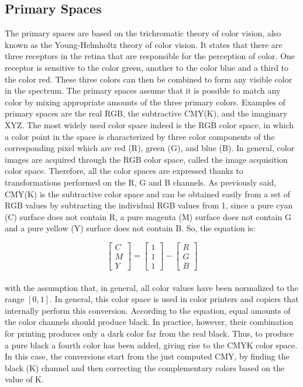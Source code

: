 \subsection{Primary Spaces}  
The primary spaces are based on the trichromatic theory of color vision, also known as the Young-Helmholtz theory of color vision. It states that there are three receptors in the retina that are responsible for the perception of color. One receptor is sensitive to the color green, another to the color blue and a third to the color red. These three colors can then be combined to form any visible color in the spectrum.
The primary spaces assume that it is possible to match any color by mixing appropriate amounts of the three primary colors. Examples of primary spaces are the real RGB, the subtractive CMY(K), and the imaginary XYZ. The most widely used color space indeed is the RGB color space, in which a color point in the space is characterized by three color components of the corresponding pixel which are red (R), green (G), and blue (B). In general, color images are acquired through the RGB color space, called the image acquisition color space. Therefore, all the color spaces are expressed thanks to transformations performed on the R, G and B channels.
As previously said, CMY(K) is the subtractive color space and can be obtained easily from a set of RGB values by subtracting the individual RGB values from 1, since a pure cyan (C) surface does not contain R, a pure magenta (M) surface does not contain G and a pure yellow (Y) surface does not contain B. So, the equation is:

\begin{equation}
\left [ { \begin{array}{c} C  \\ M   \\ Y \end{array} } \right ] = 
\left [ { \begin{array}{c} 1   \\ 1   \\ 1 \end{array} } \right ]  - \left [ { \begin{array}{c} R  \\ G  \\ B     \end{array} } \right ] 
\end{equation}
\\
with the assumption that, in general, all color values have been normalized to the range $[0,1]$. In general, this color space is used in color printers and copiers that internally perform this conversion. According to the equation, equal amounts of the color channels should produce black. In practice, however, their combination for printing produces only a dark color far from the real black. Thus, to produce a pure black a fourth color has been added, giving rise to the CMYK color space. In this case, the conversions start from the just computed CMY, by finding the black (K) channel and then correcting the complementary colors based on the value of K.

